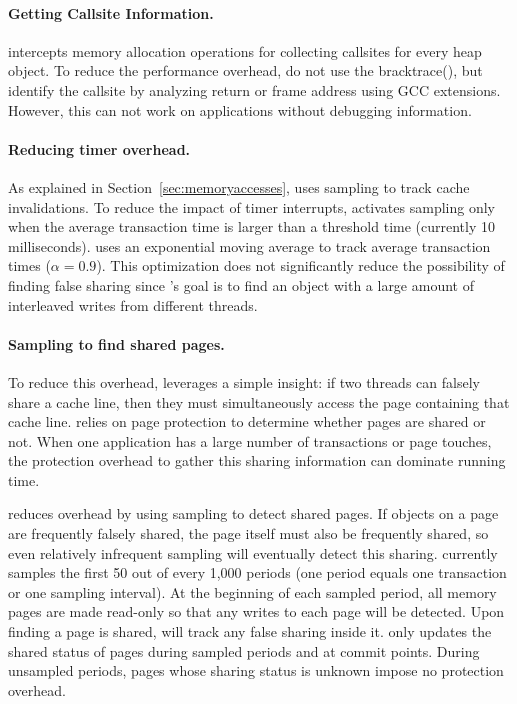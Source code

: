 \paragraph{Getting Callsite Information.}
\SheriffDetect{} intercepts memory allocation operations for collecting callsites for every heap object. To reduce the performance overhead, \SheriffDetect{} do not use the bracktrace(), but identify the callsite by analyzing return or frame address using GCC extensions. However, this can not work on applications without debugging information. 

\paragraph{Reducing timer overhead.}
As explained in Section~\ref{sec:memoryaccesses}, \SheriffDetect{} uses sampling to track cache invalidations. To reduce the impact of timer interrupts, \SheriffDetect{} activates sampling only when the average transaction time is larger than a threshold time (currently 10 milliseconds). \SheriffDetect{} uses an exponential moving average to track average transaction times ($\alpha = 0.9$). This optimization does not significantly reduce the possibility of finding false sharing since \SheriffDetect{}'s goal  is to find an object with a large amount of interleaved writes from different threads.

\paragraph{Sampling to find shared pages.} 
To reduce this overhead, \SheriffDetect{} leverages a
simple insight: if two threads can falsely share a cache line,
then they must simultaneously access the page containing
that cache line. \SheriffDetect{} relies on page protection to determine whether pages are shared or not. When one application has a large number of transactions or page touches, the protection overhead to gather this sharing information can dominate running time.

\SheriffDetect{} reduces overhead by using sampling to detect shared pages. If objects on a page are frequently falsely shared, the page itself must also be frequently shared, so even relatively infrequent sampling will eventually detect this sharing.  \SheriffDetect{} currently samples the first 50 out of every 1,000 periods (one period equals one transaction or one sampling interval). At the beginning of each sampled period, all memory pages are made read-only so that any
writes to each page will be detected. Upon finding a page is
shared, \SheriffDetect{} will track any false sharing inside it. \SheriffDetect{} only updates the shared status of pages during sampled periods and at commit points. During unsampled periods, pages whose sharing status is unknown impose no protection overhead.

